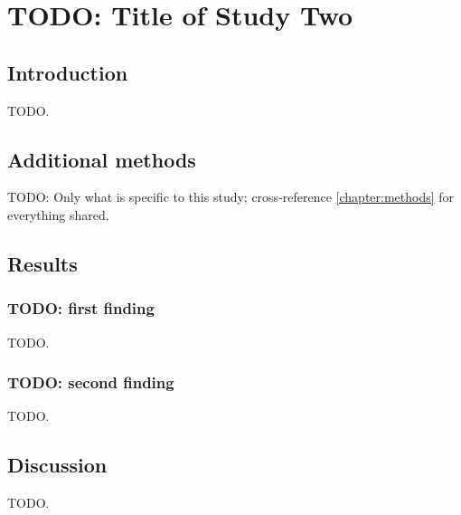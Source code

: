 \chapter{TODO: Title of Study Two}\label{chapter:study-two}
\thispagestyle{myheadings}


	\section{Introduction}\label{section:study-two:introduction}

		TODO.

	\section{Additional methods}\label{section:study-two:methods}

		TODO: Only what is specific to this study; cross-reference
		\cref{chapter:methods} for everything shared.

	\section{Results}\label{section:study-two:results}

		\subsection{TODO: first finding}

			TODO.

		\subsection{TODO: second finding}

			TODO.

	\section{Discussion}\label{section:study-two:discussion}

		TODO.
